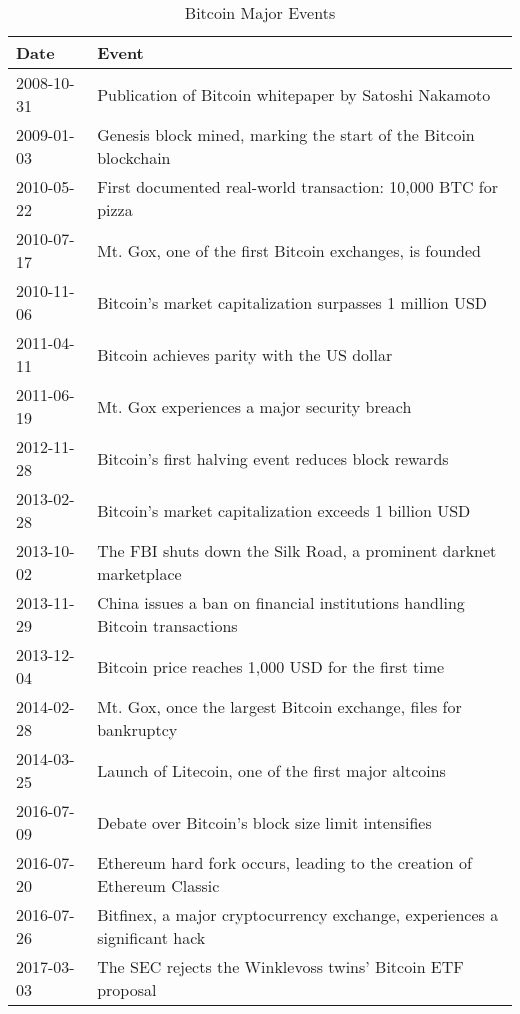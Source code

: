 \begin{table}[h]
    \centering
    \caption{Bitcoin Major Events}
    \label{tab:my-table}
    \begin{tabular}{|l|p{10cm}|}
    \hline
    Date       & Event \\
    \hline
    2008-10-31 & Publication of Bitcoin whitepaper by Satoshi Nakamoto \\
    \hline
    2009-01-03 & Genesis block mined, marking the start of the Bitcoin blockchain \\
    \hline
    2010-05-22 & First documented real-world transaction: 10,000 BTC for pizza \\
    \hline
    2010-07-17 & Mt. Gox, one of the first Bitcoin exchanges, is founded \\
    \hline
    2010-11-06 & Bitcoin's market capitalization surpasses 1 million USD \\
    \hline
    2011-04-11 & Bitcoin achieves parity with the US dollar \\
    \hline
    2011-06-19 & Mt. Gox experiences a major security breach \\
    \hline
    2012-11-28 & Bitcoin's first halving event reduces block rewards \\
    \hline
    2013-02-28 & Bitcoin's market capitalization exceeds 1 billion USD \\
    \hline
    2013-10-02 & The FBI shuts down the Silk Road, a prominent darknet marketplace \\
    \hline
    2013-11-29 & China issues a ban on financial institutions handling Bitcoin transactions \\
    \hline
    2013-12-04 & Bitcoin price reaches 1,000 USD for the first time \\
    \hline
    2014-02-28 & Mt. Gox, once the largest Bitcoin exchange, files for bankruptcy \\
    \hline
    2014-03-25 & Launch of Litecoin, one of the first major altcoins \\
    \hline
    2016-07-09 & Debate over Bitcoin's block size limit intensifies \\
    \hline
    2016-07-20 & Ethereum hard fork occurs, leading to the creation of Ethereum Classic \\
    \hline
    2016-07-26 & Bitfinex, a major cryptocurrency exchange, experiences a significant hack \\
    \hline
    2017-03-03 & The SEC rejects the Winklevoss twins' Bitcoin ETF proposal \\

\end{tabular}
\end{table}

